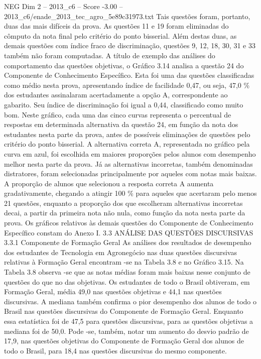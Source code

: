 \begin{textsample}{NEG Dim 2 – 2013\_c6 – Score -3.00 – 2013\_c6/enade\_2013\_tec\_agro\_5e89c31973.txt}
Tais questões foram, portanto, duas das mais difíceis da prova.
As questões 11 e 19 foram eliminadas do cômputo da nota final pelo critério do ponto bisserial.
Além destas duas, as demais questões com índice fraco de discriminação, questões 9, 12, 18, 30, 31 e 33 também não foram computadas.
A título de exemplo das análises do comportamento das questões objetivas, o Gráfico 3.14 analisa a questão 24 do Componente de Conhecimento Específico.
Esta foi uma das questões classificadas como médio nesta prova, apresentando índice de facilidade 0,47, ou seja, 47,0 \% dos estudantes assinalaram acertadamente a opção A, correspondente ao gabarito.
Seu índice de discriminação foi igual a 0,44, classificado como muito bom.
Neste gráfico, cada uma das cinco curvas representa o percentual de respostas em determinada alternativa da questão 24, em função da nota dos estudantes nesta parte da prova, antes de possíveis eliminações de questões pelo critério do ponto bisserial.
A alternativa correta A, representada no gráfico pela curva em azul, foi escolhida em maiores proporções pelos alunos com desempenho melhor nesta parte da prova.
Já as alternativas incorretas, também denominadas distratores, foram selecionadas principalmente por aqueles com notas mais baixas.
A proporção de alunos que selecionou a resposta correta A aumenta gradativamente, chegando a atingir 100 \% para aqueles que acertaram pelo menos 21 questões, enquanto a proporção dos que escolheram alternativas incorretas decai, a partir da primeira nota não nula, como função da nota nesta parte da prova.
Os gráficos relativos às demais questões do Componente de Conhecimento Específico constam do Anexo I. 3.3 ANÁLISE DAS QUESTÕES DISCURSIVAS 3.3.1 Componente de Formação Geral As análises dos resultados de desempenho dos estudantes de Tecnologia em Agronegócio nas duas questões discursivas relativas à Formação Geral encontram -se na Tabela 3.8 e no Gráfico 3.15.
Na Tabela 3.8 observa -se que as notas médias foram mais baixas nesse conjunto de questões do que no das objetivas.
Os estudantes de todo o Brasil obtiveram, em Formação Geral, média 49,0 nas questões objetivas e 44,1 nas questões discursivas.
A mediana também confirma o pior desempenho dos alunos de todo o Brasil nas questões discursivas do Componente de Formação Geral.
Enquanto essa estatística foi de 47,5 para questões discursivas, para as questões objetivas a mediana foi de 50,0.
Pode -se, também, notar um aumento do desvio padrão de 17,9, nas questões objetivas do Componente de Formação Geral dos alunos de todo o Brasil, para 18,4 nas questões discursivas do mesmo componente.

\end{textsample}
